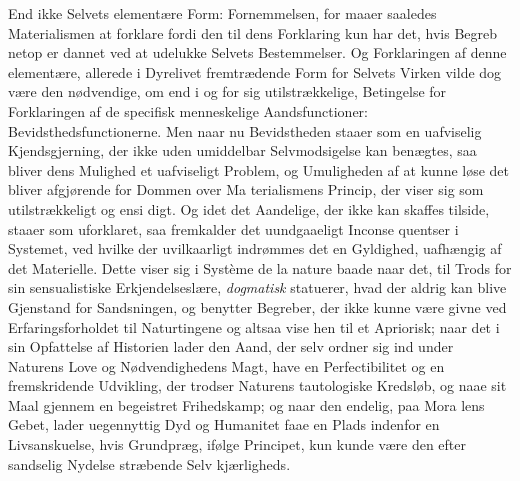 \documentclass[12pt,a4paper]{book}
\begin{document}
End ikke Selvets elementære Form: Fornemmelsen, for\-%
maaer saaledes Materialismen at forklare fordi den til dens
Forklaring kun har det, hvis Begreb netop er dannet ved at
udelukke Selvets Bestemmelser. Og Forklaringen af denne
elementære, allerede i Dyrelivet fremtrædende Form for Selvets
Virken vilde dog være den nødvendige, om end i og for sig
utilstrækkelige, Betingelse for Forklaringen af de specifisk
menneskelige Aandsfunctioner: Bevidsthedsfunctionerne. Men
naar nu Bevidstheden staaer som en uafviselig Kjendsgjerning,
der ikke uden umiddelbar Selvmodsigelse kan benægtes, saa
bliver dens Mulighed et uafviseligt Problem, og Umuligheden
af at kunne løse det bliver afgjørende for Dommen over Ma\-%
terialismens Princip, der viser sig som utilstrækkeligt og ensi\-%
digt. Og idet det Aandelige, der ikke kan skaffes tilside,
staaer som uforklaret, saa fremkalder det uundgaaeligt Inconse\-%
quentser i Systemet, ved hvilke der uvilkaarligt indrømmes
det en Gyldighed, uafhængig af det Materielle. Dette viser
sig i Système de la nature baade naar det, til Trods for sin
sensualistiske Erkjendelseslære, \emph{dogmatisk} statuerer, hvad
der aldrig kan blive Gjenstand for Sandsningen, og benytter
Begreber, der ikke kunne være givne ved Erfaringsforholdet til
Naturtingene og altsaa vise hen til et Apriorisk; naar det i
sin Opfattelse af Historien lader den Aand, der selv ordner
sig ind under Naturens Love og Nødvendighedens Magt, have
en Perfectibilitet og en fremskridende Udvikling, der trodser
Naturens tautologiske Kredsløb, og naae sit Maal gjennem en
begeistret Frihedskamp; og naar den endelig, paa Mora\-%
lens Gebet, lader uegennyttig Dyd og Humanitet faae en Plads
indenfor en Livsanskuelse, hvis Grundpræg, ifølge Principet,
kun kunde være den efter sandselig Nydelse stræbende Selv\-%
kjærligheds.
\end{document}
